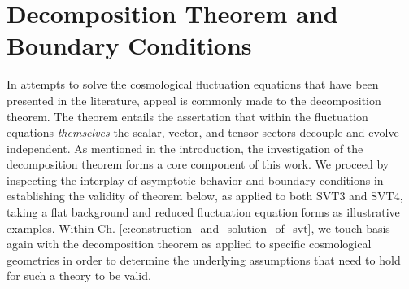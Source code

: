 \section{Decomposition Theorem and Boundary Conditions}
\label{s:decomposition_theorem}

In attempts to solve the cosmological fluctuation equations that have been presented in the literature, appeal is commonly made to the decomposition theorem. The theorem entails the assertation that within the fluctuation equations \emph{themselves} the scalar, vector, and tensor sectors decouple and evolve independent. As mentioned in the introduction, the investigation of the decomposition theorem forms a core component of this work. We proceed by inspecting the interplay of asymptotic behavior and boundary conditions in establishing the validity of theorem below, as applied to both SVT3 and SVT4, taking a flat background and reduced fluctuation equation forms as illustrative examples. Within Ch. \ref{c:construction_and_solution_of_svt}, we touch basis again with the decomposition theorem as applied to specific cosmological geometries in order to determine the underlying assumptions that need to hold for such a theory to be valid.

